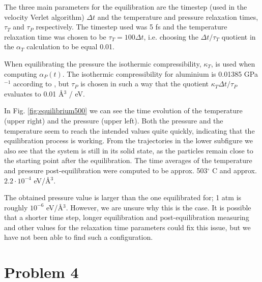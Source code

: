 The three main parameters for the equilibration are the timestep (used in the velocity Verlet algorithm) $\Delta t$ and the temperature and pressure relaxation times, $\tau_T$ and $\tau_P$ respectively. The timestep used was 5 fs and the temperature relaxation time was chosen to be $\tau_T = 100 \Delta t$, i.e. choosing the $\Delta t/\tau_T$ quotient in the $\alpha_T$ calculation to be equal 0.01.

When equilibrating the pressure the isothermic compressibility, $\kappa_T$, is used when computing $\alpha_P(t)$. The isothermic compressibility for aluminium is 0.01385 GPa$^{-1}$ according to \cite{}, but $\tau_P$ is chosen in such a way that the quotient $\kappa_T \Delta t / \tau_P$ evaluates to 0.01 \r{A}$^3$ / eV.

In Fig. \ref{fig:equilibrium500} we can see the time evolution of the temperature (upper right) and the pressure (upper left). Both the pressure and the temperature seem to reach the intended values quite quickly, indicating that the equilibration process is working. From the trajectories in the lower subfigure we also see that the system is still in its solid state, as the particles remain close to the starting point after the equilibration. The time averages of the temperature and pressure post-equilibration were computed to be approx. 503$^\circ$ C and approx. $2.2 \cdot 10^{-4}$ eV/\r{A}$^3$.

The obtained pressure value is larger than the one equilibrated for; 1 atm is roughly $10^{-6}$ eV/\r{A}$^3$. However, we are unsure why this is the case. It is possible that a shorter time step, longer equilibration and post-equilibration measuring and other values for the relaxation time parameters could fix this issue, but we have not been able to find such a configuration.
 

\section*{Problem 4}

